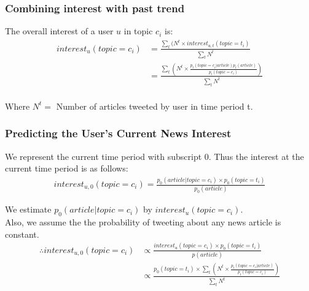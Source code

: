 \documentclass{article}
\begin{document}
\subsubsection{Combining interest with past trend}

The overall interest of a user $u$ in topic $c_i$ is: \\
\begin{equation}
\begin{aligned}
interest_u(topic = c_i) 
& = \displaystyle \frac{\sum_{t}(N^t \times interest_{u,t}(topic = t_i)}{\sum_{t} N^t}	 \\
& = \displaystyle\frac{\sum_{t} \left(N^t \times \displaystyle\frac{p_t(topic = c_i| article) p_t(article)}{p_t(topic = c_i)}\right)}{\sum_{t} N^t} \\
\end{aligned}    
\end{equation}

Where $N^t =$ Number of articles tweeted by user in time period t. \\

\subsubsection{Predicting the User’s Current News Interest}

We represent the current time period with subscript $0$. Thus the interest at the current time period is as follows: \\

\begin{equation}
\begin{aligned}
interest_{u,0}(topic = c_i) = \displaystyle\frac{p_0(article | topic = c_i) \times p_0(topic = t_i) }{p_0(article)}
\end{aligned}  
\end{equation}

We estimate $p_0(article | topic = c_i)$ by $interest_u(topic = c_i)$. \\ Also, we assume the the probability of tweeting about any news article is constant. \\

\begin{equation}
\begin{aligned}
\therefore interest_{u,0}(topic = c_i) 
& \propto \displaystyle \frac{interest_u(topic = c_i) \times p_0(topic = t_i)}{p(article)} \\
& \propto \displaystyle\frac{p_0(topic = t_i) \times \sum_{t} \left(N^t \times \displaystyle\frac{p_t(topic = c_i| article)}{p_t(topic = c_i)} \right)}{\sum_{t} N^t}
\end{aligned}
\end{equation}
\end{document}
